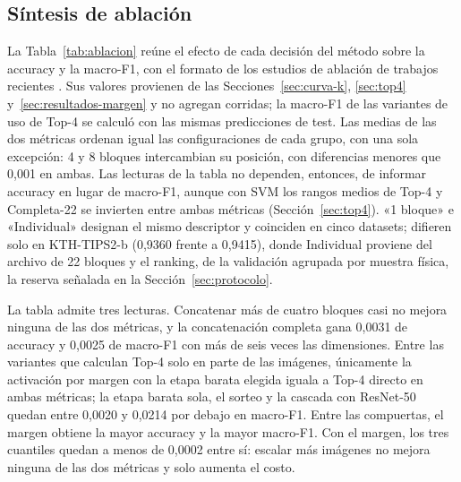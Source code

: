\documentclass[a4paper,fleqn]{cas-sc}
\begin{document}
\subsection{Síntesis de ablación}\label{sec:ablacion}

La Tabla~\ref{tab:ablacion} reúne el efecto de cada decisión del método sobre la accuracy y la macro-F1, con el formato de los estudios de ablación de trabajos recientes \citep{gupta2026hytexnet}. Sus valores provienen de las Secciones~\ref{sec:curva-k}, \ref{sec:top4} y~\ref{sec:resultados-margen} y no agregan corridas; la macro-F1 de las variantes de uso de Top-4 se calculó con las mismas predicciones de test. Las medias de las dos métricas ordenan igual las configuraciones de cada grupo, con una sola excepción: 4 y 8 bloques intercambian su posición, con diferencias menores que 0,001 en ambas. Las lecturas de la tabla no dependen, entonces, de informar accuracy en lugar de macro-F1, aunque con SVM los rangos medios de Top-4 y Completa-22 se invierten entre ambas métricas (Sección~\ref{sec:top4}). «1 bloque» e «Individual» designan el mismo descriptor y coinciden en cinco datasets; difieren solo en KTH-TIPS2-b (0,9360 frente a 0,9415), donde Individual proviene del archivo de 22 bloques y el ranking, de la validación agrupada por muestra física, la reserva señalada en la Sección~\ref{sec:protocolo}.

La tabla admite tres lecturas. Concatenar más de cuatro bloques casi no mejora ninguna de las dos métricas, y la concatenación completa gana 0,0031 de accuracy y 0,0025 de macro-F1 con más de seis veces las dimensiones. Entre las variantes que calculan Top-4 solo en parte de las imágenes, únicamente la activación por margen con la etapa barata elegida iguala a Top-4 directo en ambas métricas; la etapa barata sola, el sorteo y la cascada con ResNet-50 quedan entre 0,0020 y 0,0214 por debajo en macro-F1. Entre las compuertas, el margen obtiene la mayor accuracy y la mayor macro-F1. Con el margen, los tres cuantiles quedan a menos de 0,0002 entre sí: escalar más imágenes no mejora ninguna de las dos métricas y solo aumenta el costo.
\end{document}
